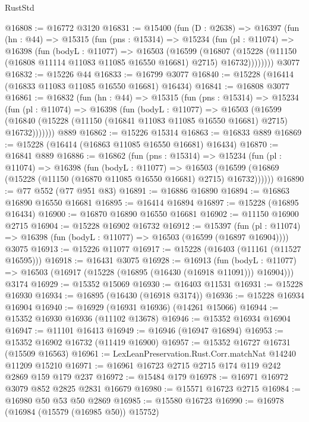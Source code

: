\begin{lexlean}{RustStd}
\begin{coremodule}
@16808 := @16772 @3120
@16831 := @15400
    (fun (D : @2638) =>
    @16397
      (fun (hn : @44) =>
      @15315
        (fun (pns : @15314) =>
        @15234
          (fun (pl : @11074) =>
          @16398
            (fun (bodyL : @11077) =>
            @16503
              (@16599
                (@16807
                  (@15228 (@11150 (@16808 @11114 @11083 @11085 @16550 @16681) @2715) @16732))))))))
    @3077
@16832 := @15226 @44
@16833 := @16799 @3077
@16840 := @15228 (@16414 (@16833 @11083 @11085 @16550 @16681) @16434)
@16841 := @16808 @3077
@16861 := @16832
    (fun (hn : @44) =>
    @15315
      (fun (pns : @15314) =>
      @15234
        (fun (pl : @11074) =>
        @16398
          (fun (bodyL : @11077) =>
          @16503
            (@16599
              (@16840 (@15228 (@11150 (@16841 @11083 @11085 @16550 @16681) @2715) @16732)))))))
    @889
@16862 := @15226 @15314
@16863 := @16833 @889
@16869 := @15228 (@16414 (@16863 @11085 @16550 @16681) @16434)
@16870 := @16841 @889
@16886 := @16862
    (fun (pns : @15314) =>
    @15234
      (fun (pl : @11074) =>
      @16398
        (fun (bodyL : @11077) =>
        @16503 (@16599 (@16869 (@15228 (@11150 (@16870 @11085 @16550 @16681) @2715) @16732))))))
@16890 := @77 @552 (@77 @951 @83)
@16891 := @16886 @16890
@16894 := @16863 @16890 @16550 @16681
@16895 := @16414 @16894
@16897 := @15228 (@16895 @16434)
@16900 := @16870 @16890 @16550 @16681
@16902 := @11150 @16900 @2715
@16904 := @15228 @16902 @16732
@16912 := @15397
    (fun (pl : @11074) => @16398 (fun (bodyL : @11077) => @16503 (@16599 (@16897 @16904))))
    @3075
@16913 := @15226 @11077
@16917 := @15228 (@16403 (@11161 (@11527 @16595)))
@16918 := @16431 @3075
@16928 := @16913
    (fun (bodyL : @11077) => @16503 (@16917 (@15228 (@16895 (@16430 (@16918 @11091))) @16904)))
    @3174
@16929 := @15352 @15069
@16930 := @16403 @11531
@16931 := @15228 @16930
@16934 := @16895 (@16430 (@16918 @3174))
@16936 := @15228 @16934 @16904
@16940 := @16929 (@16931 @16936) (@14261 @15066)
@16944 := @15352 @16930 @16936 (@11102 @13678)
@16946 := @15352 @16934 @16904
@16947 := @11101 @16413
@16949 := @16946 (@16947 @16894)
@16953 := @15352 @16902 @16732 (@11419 @16900)
@16957 := @15352 @16727 @16731 (@15509 @16563)
@16961 := LexLeanPreservation.Rust.Corr.matchNat @14240 @11209 @15210
@16971 := @16961 @16723 @2715 @2715 @174 @119 @242 @2869 @159 @179 @237
@16972 := @15484 @179
@16978 := @16971 @16972 @3079 @852 @2825 @2831 @16679
@16980 := @15571 @16723 @2715
@16984 := @16980 @50 @53 @50 @2869
@16985 := @15580 @16723
@16990 := @16978 (@16984 (@15579 (@16985 @50)) @15752)

\end{coremodule}
\end{lexlean}
